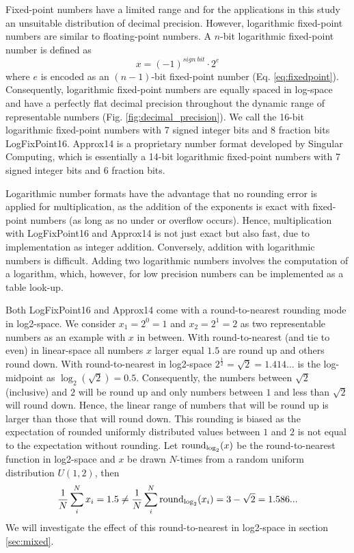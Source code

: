 Fixed-point numbers have a limited range and for the applications in this study an unsuitable distribution of decimal precision.
However, logarithmic fixed-point numbers are similar to floating-point numbers. A $n$-bit logarithmic fixed-point number is defined as
\begin{equation}
x = (-1)^{sign~bit} \cdot 2^e
\label{eq:logfixpoint}
\end{equation}
where $e$ is encoded as an $(n-1)$-bit fixed-point number (Eq. \ref{eq:fixedpoint}).
Consequently, logarithmic fixed-point numbers are equally spaced in log-space and
have a perfectly flat decimal precision throughout the dynamic range of representable
numbers (Fig. \ref{fig:decimal_precision}). We call the 16-bit logarithmic fixed-point numbers
with 7 signed integer bits and 8 fraction bits LogFixPoint16. Approx14 is a proprietary number
 format developed by Singular Computing, which is essentially a 14-bit logarithmic fixed-point
 numbers with 7 signed integer bits and 6 fraction bits.

Logarithmic number formats have the advantage that no rounding error is applied for multiplication, as the addition of the exponents
is exact with fixed-point numbers (as long as no under or overflow occurs). Hence, multiplication with LogFixPoint16 and Approx14
is not just exact but also fast, due to implementation as integer addition. Conversely, addition with logarithmic numbers is difficult.
Adding two logarithmic numbers involves the computation of a logarithm, which, however, for low precision numbers can be implemented as a table look-up.

Both LogFixPoint16 and Approx14 come with a round-to-nearest rounding mode in log2-space.  We consider $x_1 = 2^0 = 1$
and $x_2 = 2^1 = 2$ as two representable numbers as an example with $x$ in between. With round-to-nearest (and tie to even)
in linear-space all numbers $x$ larger equal $1.5$ are round up and others round down. With round-to-nearest in log2-space
$2^{\tfrac{1}{2}} = \sqrt{2} = 1.414...$ is the log-midpoint as $\log_2(\sqrt{2}) = 0.5$. Consequently, the numbers between
$\sqrt{2}$ (inclusive) and $2$ will be round up and only numbers between $1$ and less than $\sqrt{2}$ will round down.
Hence, the linear range of numbers that will be round up is larger than those that will round down. This rounding is biased
as the expectation of rounded uniformly distributed values between $1$ and $2$ is not equal to the expectation without rounding.
Let $\operatorname{round}_{\log_2}(x)$ be the round-to-nearest function in log2-space and $x$ be drawn $N$-times from a random uniform
distribution $U(1,2)$, then
\begin{equation}
    \frac{1}{N}\sum_i^N x_i = 1.5 \neq \frac{1}{N}\sum_i^N \operatorname{round}_{\log_2}(x_i) = 3 - \sqrt{2} = 1.586...
    \label{eq:biased_rounding}
\end{equation}
 We will investigate the effect of this round-to-nearest in log2-space in section \ref{sec:mixed}.


